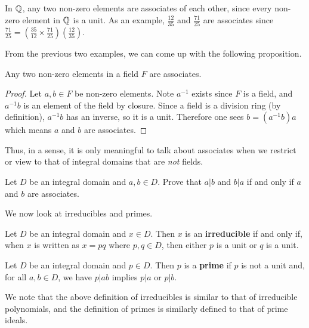 \begin{example}
    In $\mathbb{Q}$, any two non-zero elements are associates of each other, since every non-zero element in $\mathbb{Q}$ is a unit. As an example, $\frac{12}{35}$ and $\frac{71}{25}$ are associates since $\frac{71}{25} = \left(\frac{35}{12} \times \frac{71}{25}\right)\left(\frac{12}{35}\right)$.
\end{example}

From the previous two examples, we can come up with the following proposition.

\begin{proposition}
    Any two non-zero elements in a field $F$ are associates.
\end{proposition}
\begin{proof}
    Let $a, b \in F$ be non-zero elements. Note $a^{-1}$ exists since $F$ is a field, and $a^{-1}b$ is an element of the field by closure. Since a field is a division ring (by definition), $a^{-1}b$ has an inverse, so it is a unit. Therefore one sees $b = (a^{-1}b)a$ which means $a$ and $b$ are associates.
\end{proof}

Thus, in a sense, it is only meaningful to talk about associates when we restrict or view to that of integral domains that are \textit{not} fields.

\begin{exercise}
    Let $D$ be an integral domain and $a,b \in D$. Prove that $a \vert b$ and $b \vert a$ if and only if $a$ and $b$ are associates.
\end{exercise}

We now look at irreducibles and primes.
\begin{definition}
    Let $D$ be an integral domain and $x \in D$. Then $x$ is an \textbf{irreducible} if and only if, when $x$ is written as $x = pq$ where $p, q \in D$, then either $p$ is a unit or $q$ is a unit.
\end{definition}
\begin{definition}
    Let $D$ be an integral domain and $p \in D$. Then $p$ is a \textbf{prime} if $p$ is not a unit and, for all $a, b \in D$, we have $p \vert ab$ implies $p \vert a$ or $p \vert b$.
\end{definition}

We note that the above definition of irreducibles is similar to that of irreducible polynomials, and the definition of primes is similarly defined to that of prime ideals.

